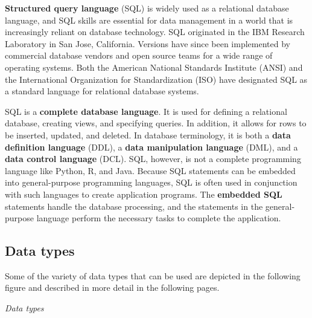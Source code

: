 \documentclass[
]{article}
\begin{document}
\textbf{Structured query language} (SQL) is widely used as a relational
database language, and SQL skills are essential for data management in a
world that is increasingly reliant on database technology. SQL
originated in the IBM Research Laboratory in San Jose, California.
Versions have since been implemented by commercial database vendors and
open source teams for a wide range of operating systems. Both the
American National Standards Institute (ANSI) and the International
Organization for Standardization (ISO) have designated SQL as a standard
language for relational database systems.

SQL is a \textbf{complete database language}. It is used for defining a
relational database, creating views, and specifying queries. In
addition, it allows for rows to be inserted, updated, and deleted. In
database terminology, it is both a \textbf{data definition language}
(DDL), a \textbf{data manipulation language} (DML), and a \textbf{data
control language} (DCL). SQL, however, is not a complete programming
language like Python, R, and Java. Because SQL statements can be
embedded into general-purpose programming languages, SQL is often used
in conjunction with such languages to create application programs. The
\textbf{embedded SQL} statements handle the database processing, and the
statements in the general-purpose language perform the necessary tasks
to complete the application.

\hypertarget{data-types}{%
\subsection*{Data types}\label{data-types}}

Some of the variety of data types that can be used are depicted in the
following figure and described in more detail in the following pages.

\emph{Data types}
\end{document}

